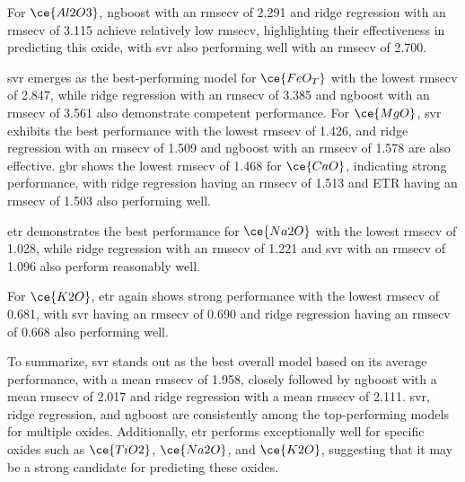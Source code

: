For $\ce{Al2O3}$, \gls{ngboost} with an \gls{rmsecv} of 2.291 and ridge regression with an \gls{rmsecv} of 3.115 achieve relatively low \gls{rmsecv}, highlighting their effectiveness in predicting this oxide, with \gls{svr} also performing well with an \gls{rmsecv} of 2.700.

\gls{svr} emerges as the best-performing model for $\ce{FeO_T}$ with the lowest \gls{rmsecv} of 2.847, while ridge regression with an \gls{rmsecv} of 3.385 and \gls{ngboost} with an \gls{rmsecv} of 3.561 also demonstrate competent performance.
For $\ce{MgO}$, \gls{svr} exhibits the best performance with the lowest \gls{rmsecv} of 1.426, and ridge regression with an \gls{rmsecv} of 1.509 and \gls{ngboost} with an \gls{rmsecv} of 1.578 are also effective.
\gls{gbr} shows the lowest \gls{rmsecv} of 1.468 for $\ce{CaO}$, indicating strong performance, with ridge regression having an \gls{rmsecv} of 1.513 and ETR having an \gls{rmsecv} of 1.503 also performing well.

\gls{etr} demonstrates the best performance for $\ce{Na2O}$ with the lowest \gls{rmsecv} of 1.028, while ridge regression with an \gls{rmsecv} of 1.221 and \gls{svr} with an \gls{rmsecv} of 1.096 also perform reasonably well.

For $\ce{K2O}$, \gls{etr} again shows strong performance with the lowest \gls{rmsecv} of 0.681, with \gls{svr} having an \gls{rmsecv} of 0.690 and ridge regression having an \gls{rmsecv} of 0.668 also performing well.

To summarize, \gls{svr} stands out as the best overall model based on its average performance, with a mean \gls{rmsecv} of 1.958, closely followed by \gls{ngboost} with a mean \gls{rmsecv} of 2.017 and ridge regression with a mean \gls{rmsecv} of 2.111.
\gls{svr}, ridge regression, and \gls{ngboost} are consistently among the top-performing models for multiple oxides.
Additionally, \gls{etr} performs exceptionally well for specific oxides such as $\ce{TiO2}$, $\ce{Na2O}$, and $\ce{K2O}$, suggesting that it may be a strong candidate for predicting these oxides.

